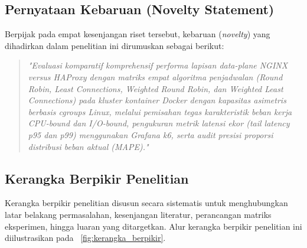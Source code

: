 \subsection{Pernyataan Kebaruan (Novelty Statement)}
Berpijak pada empat kesenjangan riset tersebut, kebaruan (\textit{novelty}) yang dihadirkan dalam penelitian ini dirumuskan sebagai berikut:
\begin{quote}
    \textit{"Evaluasi komparatif komprehensif performa lapisan data-plane NGINX versus HAProxy dengan matriks empat algoritma penjadwalan (Round Robin, Least Connections, Weighted Round Robin, dan Weighted Least Connections) pada kluster kontainer Docker dengan kapasitas asimetris berbasis cgroups Linux, melalui pemisahan tegas karakteristik beban kerja CPU-bound dan I/O-bound, pengukuran metrik latensi ekor (tail latency p95 dan p99) menggunakan Grafana k6, serta audit presisi proporsi distribusi beban aktual (MAPE)."}
\end{quote}

\subsection{Kerangka Berpikir Penelitian}
Kerangka berpikir penelitian disusun secara sistematis untuk menghubungkan latar belakang permasalahan, kesenjangan literatur, perancangan matriks eksperimen, hingga luaran yang ditargetkan. Alur kerangka berpikir penelitian ini diilustrasikan pada \figurename\ \ref{fig:kerangka_berpikir}.

